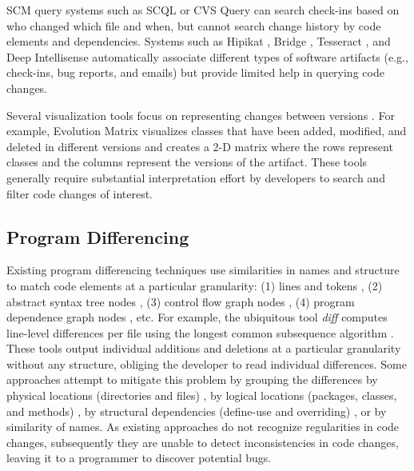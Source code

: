 \documentclass[runningheads,a4paper]{llncs}
\begin{document}
 
SCM query systems such as SCQL \cite{Hindle2005} or CVS Query \cite{bonsai} can search check-ins based on who changed which file and when, but cannot search change history by code elements and dependencies. Systems such as Hipikat \cite{Cubranic2003}, Bridge \cite{Venolia2006:bridge}, Tesseract \cite{Sarma2009:tesseract}, and Deep Intellisense \cite{Holmes2008:intellisense} automatically associate different types of software artifacts (e.g., check-ins, bug reports, and emails) but provide limited help in querying code changes. 

Several visualization tools focus on representing changes between versions \cite{Ball1996, Eick2002, Girba2004, Holt1996, Lanza2001, Lanza2003, Rysselberghe2004a}. For example, Evolution Matrix \cite{Lanza2001} visualizes classes that have been added, modified, and deleted in different versions and creates a 2-D matrix where the rows represent classes and the columns represent the versions of the artifact. These tools generally require substantial interpretation effort by developers to search and filter code changes of interest. 

\subsection{Program Differencing} 
Existing program differencing techniques use similarities in names and structure to match code elements at a particular granularity: (1) lines and tokens \cite{Apostolico1997, Hunt1977, Reiss2008, Tichy1984}, (2) abstract syntax tree nodes \cite{Cottrell2007, Fluri2007, Hunt2002, Neamtiu2005, Raghavan2004, Yang1991}, (3) control flow graph nodes \cite{Apiwattanapong2004, Laski1992}, (4) program dependence graph nodes \cite{Binkley1995, Horwitz1990, Jackson1994}, etc.  For example, the ubiquitous tool {\it diff} computes line-level differences per file using the longest common subsequence algorithm \cite{Hunt1977}. These tools output individual additions and deletions at a particular granularity without any structure, obliging the developer to read individual differences. Some approaches attempt to mitigate this problem by grouping the differences by physical locations (directories and files) \cite{Hunt1976}, by logical locations (packages, classes, and methods) \cite{Xing2005}, by structural dependencies (define-use and overriding) \cite{Chesley2005}, or by similarity of names. 
As existing approaches do not recognize regularities in code changes, subsequently they are unable to detect inconsistencies in code changes, leaving it to a programmer to discover potential bugs.  
\end{document}
